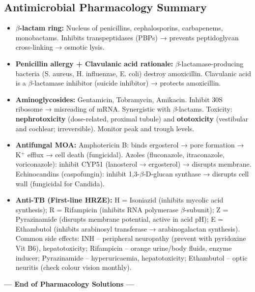 \documentclass[11pt,a4paper]{article}
\begin{document}
\subsection{Antimicrobial Pharmacology Summary}
\begin{itemize}[leftmargin=*]
    \item \textbf{$\beta$-lactam ring:} Nucleus of penicillins, cephalosporins, carbapenems, monobactams. Inhibits transpeptidases (PBPs) → prevents peptidoglycan cross-linking → osmotic lysis.
    \item \textbf{Penicillin allergy + Clavulanic acid rationale:} $\beta$-lactamase-producing bacteria (S. aureus, H. influenzae, E. coli) destroy amoxicillin. Clavulanic acid is a $\beta$-lactamase inhibitor (suicide inhibitor) → protects amoxicillin.
    \item \textbf{Aminoglycosides:} Gentamicin, Tobramycin, Amikacin. Inhibit 30S ribosome → misreading of mRNA. Synergistic with $\beta$-lactams. Toxicity: \textbf{nephrotoxicity} (dose-related, proximal tubule) and \textbf{ototoxicity} (vestibular and cochlear; irreversible). Monitor peak and trough levels.
    \item \textbf{Antifungal MOA:} Amphotericin B: binds ergosterol → pore formation → K$^+$ efflux → cell death (fungicidal). Azoles (fluconazole, itraconazole, voriconazole): inhibit CYP51 (lanosterol → ergosterol) → disrupts membrane. Echinocandins (caspofungin): inhibit 1,3-$\beta$-D-glucan synthase → disrupts cell wall (fungicidal for Candida).
    \item \textbf{Anti-TB (First-line HRZE):} H = Isoniazid (inhibits mycolic acid synthesis); R = Rifampicin (inhibits RNA polymerase $\beta$-subunit); Z = Pyrazinamide (disrupts membrane potential, active in acid pH); E = Ethambutol (inhibits arabinosyl transferase → arabinogalactan synthesis). Common side effects: INH -- peripheral neuropathy (prevent with pyridoxine Vit B6), hepatotoxicity; Rifampicin -- orange urine/body fluids, enzyme inducer; Pyrazinamide -- hyperuricaemia, hepatotoxicity; Ethambutol -- optic neuritis (check colour vision monthly).
\end{itemize}

\vspace{1cm}
\begin{center}
\textbf{--- End of Pharmacology Solutions ---}
\end{center}
\end{document}
